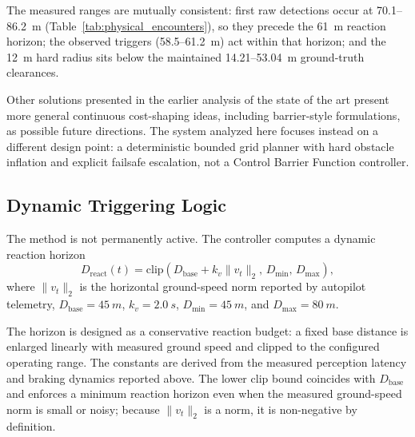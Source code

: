 \documentclass[electronics,article,submit,moreauthors]{Definitions/mdpi}
\DeclareRobustCommand{\deleted}[1]{}%
\DeclareRobustCommand{\added}[1]{#1}%
\DeclareRobustCommand{\deleted}[1]{\textcolor{black}{\sout{#1}}}
\DeclareRobustCommand{\added}[1]{\textcolor{green!50!black}{#1}}
\def\deleted#1{}%
\def\added#1{#1}%
\begin{document}
\added{The measured ranges are mutually consistent: first raw detections occur at 70.1--86.2~m (Table~\ref{tab:physical_encounters}), so they precede the 61~m reaction horizon; the observed triggers (58.5--61.2~m) act within that horizon; and the 12~m hard radius sits below the maintained 14.21--53.04~m ground-truth clearances.}





Other solutions presented in the earlier analysis of the state of the art present more general continuous cost-shaping ideas, including barrier-style formulations, as possible future directions. The system analyzed here \deleted{is more focus on other aspects}\added{focuses instead on a different design point}: a deterministic bounded grid planner with hard obstacle inflation and explicit failsafe escalation, not a Control Barrier Function controller.

\subsection{Dynamic Triggering Logic}

The method is not permanently active. The controller computes a dynamic reaction horizon
\begin{equation}
    D_{\mathrm{react}}(t) =
    \mathrm{clip}\!\left(D_{\mathrm{base}} + k_v \lVert v_t \rVert_2,\,
    D_{\min},\, D_{\max}\right),
\end{equation}
where $\lVert v_t \rVert_2$ is the horizontal ground-speed norm reported by autopilot telemetry, $D_{\mathrm{base}}=45~m$, $k_v=2.0~s$, $D_{\min}=45~m$, and $D_{\max}=80~m$.

The horizon \deleted{can be read}\added{is designed} as a \deleted{stopping-and-reaction}\added{conservative reaction} budget: \deleted{the}\added{a fixed} base distance \deleted{covers the detection-to-decision latency of the 10~Hz control loop plus a conservative braking margin at the 8~m/s cruise speed, and the speed gain enlarges it}\added{is enlarged} linearly with \deleted{the actual}\added{measured} ground speed\deleted{.}\added{ and clipped to the configured operating range. The constants are derived from the measured perception latency and braking dynamics reported above.} The lower clip bound coincides with $D_{\mathrm{base}}$ and \deleted{acts as a guard against negative}\added{enforces a minimum reaction horizon even when the measured ground-speed norm is small} or noisy\deleted{ speed estimates, so the horizon never shrinks below the base distance.}\added{; because $\lVert v_t\rVert_2$ is a norm, it is non-negative by definition.}
\end{document}
